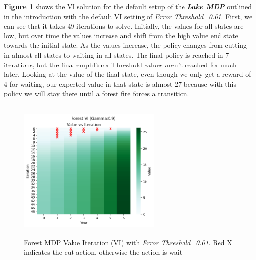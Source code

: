 \documentclass[letterpaper]{article} %
\begin{document}
\textbf{Figure \ref{fig:forest_vi}} shows the VI solution for the default setup of the  \textbf{\emph{Lake MDP}} outlined in the introduction with the default VI setting of \emph{Error Threshold=0.01}.  First, we can see that it takes 49 iterations to solve.  Initially, the values for all states are low, but over time the values increase and shift from the high value end state towards the initial state.  As the values increase, the policy changes from cutting in almost all states to waiting in all states.  The final policy is reached in 7 iterations, but the final emph{Error Threshold} values aren't reached for much later.  Looking at the value of the final state, even though we only get a reward of 4 for waiting, our expected value in that state is almost 27 because with this policy we will stay there until a forest fire forces a transition. 

\begin{figure}[!htb]
\centering
\includegraphics[width=2.75in, height=2.75in]{Figures/Forest_VI_Gamma_0_9_Value_vs_Iteration.png}
\caption{Forest MDP Value Iteration (VI) with \emph{Error Threshold=0.01}. Red X indicates the cut action, otherwise the action is wait. }
\label{fig:forest_vi}
\end{figure}
\end{document}
